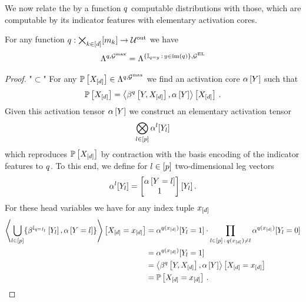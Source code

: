 We now relate the by a function $q$ computable distributions with those, which are computable by its indicator features with elementary activation cores.

\begin{lemma}
    \label{lem:computableByFunctionEqualElementaryIndicators}
    For any function $q:\bigtimes_{k\in[d]}[m_{k}]\rightarrow\mathcal{U}^{\mathrm{out}}$ we have
    \begin{align*}
        \Lambda^{q,\mathcal{G}^{\mathrm{max}}}
        = \Lambda^{\{\mathbb{I}_{q=y}\,:\,y\in\mathrm{im}\left(q\right)\},\mathcal{G}^{\mathrm{EL}}}
    \end{align*}
\end{lemma}
\begin{proof}
    "$\subset$"
    For any $\mathbb{P}\left[X_{[d]}\right]\in\Lambda^{q,\mathcal{G}^{\mathrm{max}}}$ we find an activation core $\alpha\left[Y\right]$ such that
    \begin{align*}
        \mathbb{P}\left[X_{[d]}\right] = \left\langle \beta^{q}\left[Y,X_{[d]}\right],\alpha\left[Y\right]\right\rangle \left[ X_{[d]} \right] \, .
    \end{align*}
    Given this activation tensor $\alpha\left[Y\right]$ we construct an elementary activation tensor
    \begin{align*}
        \bigotimes_{l\in[p]}\alpha^{l}[Y_{l}]
    \end{align*}
    which reproduces $\mathbb{P}\left[X_{[d]}\right]$ by contraction with the basis encoding of the indicator features to $q$. %
    To this end, we define for $l\in[p]$ two-dimensional leg vectors
    \begin{align*}
        \alpha^{l}[Y_{l}]
        = \begin{bmatrix}
              \alpha\left[Y=l\right] \\
              1
        \end{bmatrix}[Y_{l}] \, .
    \end{align*}
    For these head variables we have for any index tuple $x_{[d]}$
    \begin{align*}
        \left\langle \bigcup_{l\in[p]}\{\beta^{\mathbb{I}_{q=I_{l}}}\left[Y_{l}\right],\alpha\left[Y=l\right]\}\right\rangle \left[ X_{[d]}=x_{[d]} \right]
        & = \alpha^{q(x_{[d]})}[Y_{l}=1] \cdot \prod_{l\in[p] \,:\, q(x_{[d]}) \neq l} \alpha^{q(x_{[d]})}[Y_{l}=0] \\
        & = \alpha^{q(x_{[d]})}[Y_{l}=1] \\
        & = \left\langle \beta^{q}\left[Y,X_{[d]}\right],\alpha\left[Y\right]\right\rangle \left[ X_{[d]}=x_{[d]} \right] \\
        & = \mathbb{P}\left[X_{[d]}=x_{[d]}\right] \, .
    \end{align*}


\end{proof}
